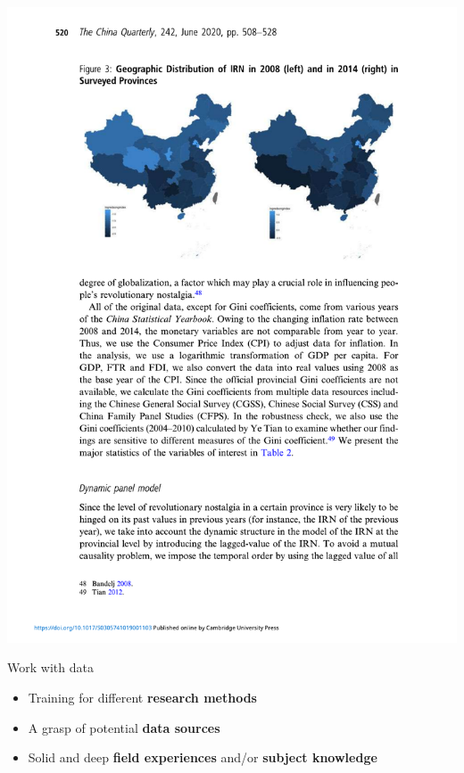 \documentclass[
  10pt,
  ignorenonframetext,
]{beamer}
\begin{document}
\begin{frame}
\begin{center}\includegraphics[width=0.9\linewidth]{Figs/Examples/yan_res} \end{center}
\end{frame}

\begin{frame}{Work with data}
\label{work-with-data}
\begin{itemize}
  \item Training for different \textbf{research methods}
  \vspace{1cm}
  \item A grasp of potential \textbf{data sources}
  \vspace{1cm}
  \item Solid and deep \textbf{field experiences} and/or \textbf{subject knowledge}
\end{itemize}
\end{frame}
\end{document}
